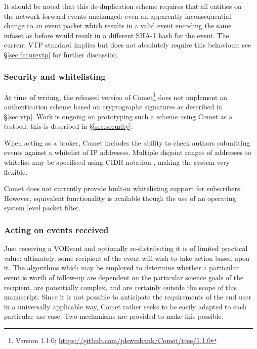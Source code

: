 \documentclass[5p,authoryear]{elsarticle}
\begin{document}
It should be noted that this de-duplication scheme requires that all entities
on the network forward events unchanged: even an apparently inconsequential
change to an event packet which results in a valid event encoding the same
infoset as before would result in a different SHA-1 hash for the event. The
current VTP standard implies but does not absolutely require this behaviour:
see \S\ref{sec:futurevtp} for further discussion.

\subsubsection{Security and whitelisting}
\label{sec:design:security}

At time of writing, the released version of Comet\footnote{Version 1.1.0;
\url{https://github.com/jdswinbank/Comet/tree/1.1.0}} does not implement an
authentication scheme based on cryptographc signatures as described in
\S\ref{sec:vtp}. Work is ongoing on prototyping such a scheme using Comet as a
testbed: this is described in \S\ref{sec:security}.

When acting as a broker, Comet includes the ability to check authors
submitting events against a whitelist of IP addresses. Multiple disjoint
ranges of addresses to whitelist may be specificed using CIDR notation
\citep{Fuller:1993}, making the system very flexible.

Comet does not currently provide built-in whitelisting support for
subscribers. However, equivalent functionality is available though the use of
an operating system level packet filter.

\subsubsection{Acting on events received}
\label{sec:design:plugin}

Just receiving a VOEvent and optionally re-distributing it is of limited
practical value: ultimately, some recipient of the event will wish to take
action based upon it. The algorithms which may be employed to determine
whether a particular event is worth of follow-up are dependent on the
particular science goals of the recipient, are potentially complex, and are
certainly outside the scope of this manuscript. Since it is not possible to
anticipate the requirements of the end user in a universally applicable way,
Comet rather seeks to be easily adapted to each particular use case. Two
mechanisms are provided to make this possible.
\end{document}

